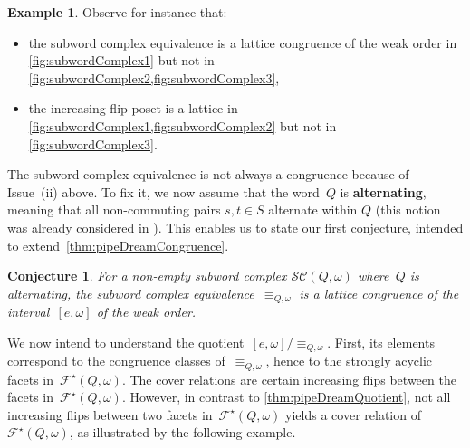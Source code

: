\documentclass[reqno]{amsart}
\newtheorem{conjecture}[theorem]{Conjecture}
\theoremstyle{definition}
\newtheorem{example}[theorem]{Example}
\newcommand{\defn}[1]{\textbf{\textsf{\color{PineGreen} #1}}} %
\newcommand{\subwordComplex}{\mathcal{SC}} %
\newcommand{\subwordStronglyAcyclicFacets}{\mathcal{F}^\star} %
\begin{document}
\begin{example}
Observe for instance that:
\begin{itemize}
\item the subword complex equivalence is a lattice congruence of the weak order in \cref{fig:subwordComplex1} but not in \cref{fig:subwordComplex2,fig:subwordComplex3},
\item the increasing flip poset is a lattice in \cref{fig:subwordComplex1,fig:subwordComplex2} but not in \cref{fig:subwordComplex3}.
\end{itemize}
\end{example}

The subword complex equivalence is not always a congruence because of Issue~(ii) above.
To fix it, we now assume that the word~$Q$ is \defn{alternating}, meaning that all non-commuting pairs $s, t\in S$ alternate within $Q$ (this notion was already considered in \cite{PilaudSantos-brickPolytope, CeballosLabbeStump}).
This enables us to state our first conjecture, intended to extend~\cref{thm:pipeDreamCongruence}.

\begin{conjecture}
\label{conj:latticeCongruenceAlternating}
For a non-empty subword complex $\subwordComplex(Q,\omega)$ where~$Q$ is alternating, the subword complex equivalence~$\equiv_{Q,\omega}$ is a lattice congruence of the interval~$[e,\omega]$ of the weak order.
\end{conjecture}

We now intend to understand the quotient~$[e, \omega]/\equiv_{Q, \omega}$.
First, its elements correspond to the congruence classes of~$\equiv_{Q, \omega}$, hence to the strongly acyclic facets in~$\subwordStronglyAcyclicFacets(Q, \omega)$.
The cover relations are certain increasing flips between the facets in~$\subwordStronglyAcyclicFacets(Q, \omega)$.
However, in contrast to \cref{thm:pipeDreamQuotient}, not all increasing flips between two facets in~$\subwordStronglyAcyclicFacets(Q, \omega)$ yields a cover relation of~$\subwordStronglyAcyclicFacets(Q, \omega)$, as illustrated by the following example.
\end{document}
